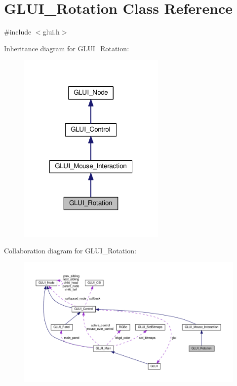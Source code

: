 \hypertarget{class_g_l_u_i___rotation}{\section{G\+L\+U\+I\+\_\+\+Rotation Class Reference}
\label{class_g_l_u_i___rotation}
}


{\ttfamily \#include $<$glui.\+h$>$}



Inheritance diagram for G\+L\+U\+I\+\_\+\+Rotation\+:\nopagebreak
\begin{figure}[H]
\begin{center}
\leavevmode
\includegraphics[width=204pt]{class_g_l_u_i___rotation__inherit__graph}
\end{center}
\end{figure}


Collaboration diagram for G\+L\+U\+I\+\_\+\+Rotation\+:\nopagebreak
\begin{figure}[H]
\begin{center}
\leavevmode
\includegraphics[width=350pt]{class_g_l_u_i___rotation__coll__graph}
\end{center}
\end{figure}
